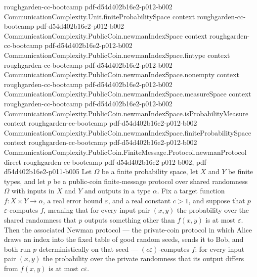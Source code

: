 \begin{theorem}
  {roughgarden-cc-bootcamp}
  {pdf-d54d402b16e2-p012-b002}
\proofstep
  {CommunicationComplexity.Unit.finiteProbabilitySpace}
  {context}
  {roughgarden-cc-bootcamp}
  {pdf-d54d402b16e2-p012-b002}
\proofstep
  {CommunicationComplexity.PublicCoin.newmanIndexSpace}
  {context}
  {roughgarden-cc-bootcamp}
  {pdf-d54d402b16e2-p012-b002}
\proofstep
  {CommunicationComplexity.PublicCoin.newmanIndexSpace.fintype}
  {context}
  {roughgarden-cc-bootcamp}
  {pdf-d54d402b16e2-p012-b002}
\proofstep
  {CommunicationComplexity.PublicCoin.newmanIndexSpace.nonempty}
  {context}
  {roughgarden-cc-bootcamp}
  {pdf-d54d402b16e2-p012-b002}
\proofstep
  {CommunicationComplexity.PublicCoin.newmanIndexSpace.measureSpace}
  {context}
  {roughgarden-cc-bootcamp}
  {pdf-d54d402b16e2-p012-b002}
\proofstep
  {CommunicationComplexity.PublicCoin.newmanIndexSpace.isProbabilityMeasure}
  {context}
  {roughgarden-cc-bootcamp}
  {pdf-d54d402b16e2-p012-b002}
\proofstep
  {CommunicationComplexity.PublicCoin.newmanIndexSpace.finiteProbabilitySpace}
  {context}
  {roughgarden-cc-bootcamp}
  {pdf-d54d402b16e2-p012-b002}
\proofstep
  {CommunicationComplexity.PublicCoin.FiniteMessage.Protocol.newmanProtocol}
  {direct}
  {roughgarden-cc-bootcamp}
  {pdf-d54d402b16e2-p012-b002,
    pdf-d54d402b16e2-p011-b005}
Let $\Omega$ be a finite probability space, let $X$ and $Y$ be finite types, and let $p$
be a public-coin finite-message protocol over shared randomness $\Omega$ with inputs in
$X$ and $Y$ and outputs in a type $\alpha$. Fix a target function $f : X \times Y \to
\alpha$, a real error bound $\varepsilon$, and a real constant $c > 1$, and suppose that
$p$ $\varepsilon$-computes $f$, meaning that for every input pair $(x,y)$ the
probability over the shared randomness that $p$ outputs something other than $f(x,y)$ is
at most $\varepsilon$. Then the associated Newman protocol — the private-coin protocol
in which Alice draws an index into the fixed table of good random seeds, sends it to
Bob, and both run $p$ deterministically on that seed — $(c\varepsilon)$-computes $f$:
for every input pair $(x,y)$ the probability over the private randomness that its output
differs from $f(x,y)$ is at most $c\varepsilon$.
\end{theorem}

